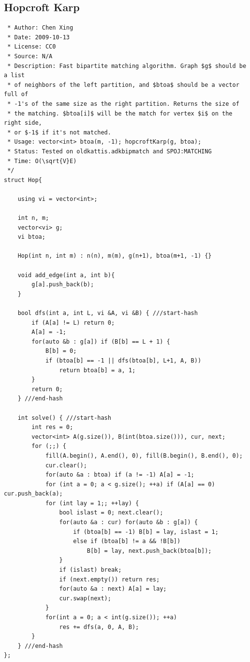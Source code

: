 \documentclass[11pt, a4paper, twoside]{article}
\begin{document}
\subsection{Hopcroft Karp}
\begin{verbatim}
 * Author: Chen Xing
 * Date: 2009-10-13
 * License: CC0
 * Source: N/A
 * Description: Fast bipartite matching algorithm. Graph $g$ should be a list
 * of neighbors of the left partition, and $btoa$ should be a vector full of
 * -1's of the same size as the right partition. Returns the size of
 * the matching. $btoa[i]$ will be the match for vertex $i$ on the right side,
 * or $-1$ if it's not matched.
 * Usage: vector<int> btoa(m, -1); hopcroftKarp(g, btoa);
 * Status: Tested on oldkattis.adkbipmatch and SPOJ:MATCHING
 * Time: O(\sqrt{V}E)
 */
struct Hop{
    
    using vi = vector<int>;
    
    int n, m;
    vector<vi> g;
    vi btoa;
    
    Hop(int n, int m) : n(n), m(m), g(n+1), btoa(m+1, -1) {}
    
    void add_edge(int a, int b){
        g[a].push_back(b);
    }
    
    bool dfs(int a, int L, vi &A, vi &B) { ///start-hash
        if (A[a] != L) return 0;
        A[a] = -1;
        for(auto &b : g[a]) if (B[b] == L + 1) {
            B[b] = 0;
            if (btoa[b] == -1 || dfs(btoa[b], L+1, A, B))
                return btoa[b] = a, 1;
        }
        return 0;
    } ///end-hash
    
    int solve() { ///start-hash
        int res = 0;
        vector<int> A(g.size()), B(int(btoa.size())), cur, next;
        for (;;) {
            fill(A.begin(), A.end(), 0), fill(B.begin(), B.end(), 0);
            cur.clear();
            for(auto &a : btoa) if (a != -1) A[a] = -1;
            for (int a = 0; a < g.size(); ++a) if (A[a] == 0) cur.push_back(a);
            for (int lay = 1;; ++lay) { 
                bool islast = 0; next.clear();
                for(auto &a : cur) for(auto &b : g[a]) {
                    if (btoa[b] == -1) B[b] = lay, islast = 1;
                    else if (btoa[b] != a && !B[b])
                        B[b] = lay, next.push_back(btoa[b]);
                }
                if (islast) break;
                if (next.empty()) return res;
                for(auto &a : next) A[a] = lay;
                cur.swap(next);
            }
            for(int a = 0; a < int(g.size()); ++a)
                res += dfs(a, 0, A, B);
        }
    } ///end-hash
};
\end{verbatim}
\end{document}
